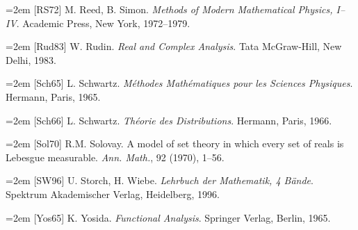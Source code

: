 \par\hangindent=2em [RS72] M. Reed, B. Simon. \emph{Methods of Modern Mathematical Physics, I–IV}. Academic Press, New York, 1972–1979.\par

\par\hangindent=2em [Rud83] W. Rudin. \emph{Real and Complex Analysis}. Tata McGraw-Hill, New Delhi, 1983.\par

\par\hangindent=2em [Sch65] L. Schwartz. \emph{Méthodes Mathématiques pour les Sciences Physiques}. Hermann, Paris, 1965.\par

\par\hangindent=2em [Sch66] L. Schwartz. \emph{Théorie des Distributions}. Hermann, Paris, 1966.\par

\par\hangindent=2em [Sol70] R.M. Solovay. A model of set theory in which every set of reals is Lebesgue measurable. \emph{Ann. Math.}, 92 (1970), 1–56.\par

\par\hangindent=2em [SW96] U. Storch, H. Wiebe. \emph{Lehrbuch der Mathematik, 4 Bände}. Spektrum Akademischer Verlag, Heidelberg, 1996.\par

\par\hangindent=2em [Yos65] K. Yosida. \emph{Functional Analysis}. Springer Verlag, Berlin, 1965.\par
\endgroup
